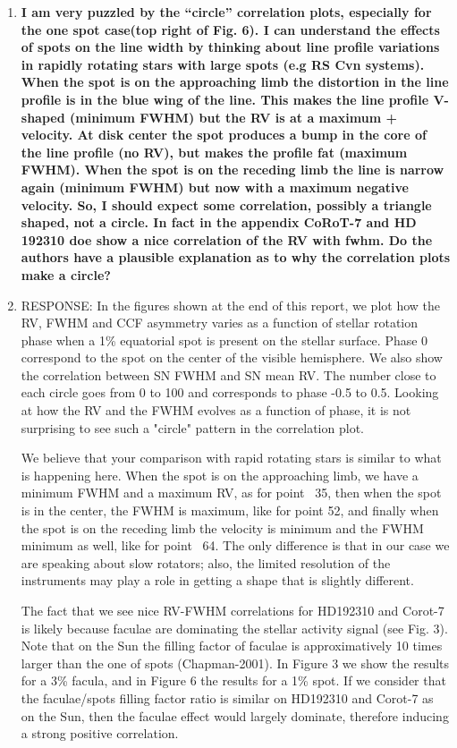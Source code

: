 \documentclass[11pt]{article}   	%
\begin{document}
\begin{enumerate}
\bigskip
%
%
\item {\bf I am very puzzled by the ``circle'' correlation plots, especially for the one spot case(top right of Fig. 6). I can understand the effects of spots on the line width by thinking about line profile variations in rapidly rotating stars with large spots (e.g RS Cvn systems). When the spot is on the approaching limb the distortion in the line profile is in the blue wing of the line. This makes the line profile V-shaped (minimum FWHM) but the RV is at a maximum + velocity. At disk center the spot produces a bump in the core of the line profile (no RV), but makes the profile fat (maximum FWHM). When the spot is on the receding limb the line is narrow again (minimum FWHM) but now with a maximum negative velocity. So, I should expect some correlation, possibly a triangle shaped, not a circle. In fact in the appendix CoRoT-7 and HD 192310 doe show a nice correlation of the RV with fwhm. Do the authors have a plausible explanation as to why the correlation plots make a circle?}
%
\item[]  RESPONSE:  In the figures shown at the end of this report, we plot how the RV, FWHM and CCF asymmetry varies as a function of stellar rotation phase when a 1\% equatorial spot is present on the stellar surface. Phase 0 correspond to the spot on the center of the visible hemisphere. We also show the correlation between SN FWHM and SN mean RV. The number close to each circle goes from 0 to 100 and corresponds to phase -0.5 to 0.5. Looking at how the RV and the FWHM evolves as a function of phase, it is not surprising to see such a "circle" pattern in the correlation plot.

We believe that your comparison with rapid rotating stars is similar to what is happening here. When the spot is on the approaching limb, we have a minimum FWHM and a maximum RV, as for point ~35, then when the spot is in the center, the FWHM is maximum, like for point 52, and finally when the spot is on the receding limb the velocity is minimum and the FWHM minimum as well, like for point ~64. The only difference is that in our case we are speaking about slow rotators; also, the limited resolution of the instruments may play a role in getting a shape that is slightly different.

The fact that we see nice RV-FWHM correlations for HD192310 and Corot-7 is likely because faculae are dominating the stellar activity signal (see Fig. 3). Note that on the Sun the filling factor of faculae is approximatively 10 times larger than the one of spots (Chapman-2001). In Figure 3 we show the results for a 3\% facula, and in Figure 6 the results for a 1\% spot. If we consider that the faculae/spots filling factor ratio is similar on HD192310 and Corot-7 as on the Sun, then the faculae effect would largely dominate, therefore inducing a strong positive correlation.



\end{enumerate}
\end{document}
